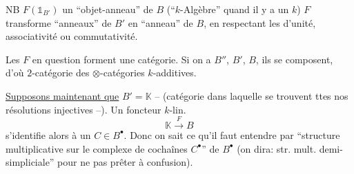 NB $F(\mathbb 1_{B'})$  un ``objet-anneau'' de $B$ (``$k$-Algèbre'' quand il y a un $k$) $F$ transforme ``anneaux'' de $B'$ en ``anneau'' de $B$, en respectant les  d'unité, associativité ou commutativité.

Les $F$ en question forment une catégorie. Si on a $B''$, $B'$, $B$, ils se composent, d'où $2$-catégorie des $\otimes$-catégories $k$-additives.

\uline{Supposons maintenant que} $B'=\mathbb{K}$ -- (catégorie dans laquelle se trouvent ttes nos résolutions injectives --). Un foncteur $k$-lin.
\[
\mathbb{K}\xrightarrow{F}B
\]
s'identifie alors à un $C\in B^{\bullet}$. Donc on sait ce qu'il faut entendre par ``structure multiplicative sur le complexe de cochaînes $C^{\bullet}$'' de $B^{\bullet}$ (on dira: str. mult. demi-simpliciale'' pour ne pas prêter à confusion).
